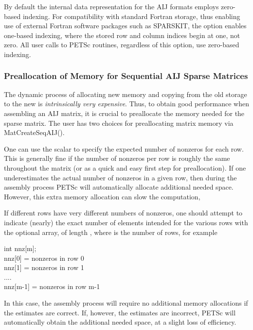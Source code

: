 By default the internal data representation for the AIJ formats employs
zero-based indexing.  For compatibility with standard Fortran storage,
thus enabling use of external Fortran software packages such as
SPARSKIT,  the option 
 enables one-based indexing, where the stored
row and column indices begin at one, not zero.  All user calls to
PETSc routines, regardless of this option, use zero-based indexing.

\subsubsection{Preallocation of Memory for Sequential AIJ Sparse Matrices}

The dynamic process of allocating new memory and copying from the old
storage to the new is {\em intrinsically very expensive}.  Thus, to
obtain good performance when assembling an AIJ matrix, it is crucial
to preallocate the memory needed for the sparse matrix.  The user has
two choices for preallocating matrix memory via MatCreateSeqAIJ(). 

One can use the scalar  to specify the expected
number of nonzeros for each row.  This is generally fine if the number
of nonzeros per row is roughly the same throughout the matrix (or as a
quick and easy first step for preallocation).  If one underestimates
the actual number of nonzeros in a given row, then during the assembly
process PETSc will automatically allocate additional needed space.
However, this extra memory allocation can slow the computation,

If different rows have very different numbers of nonzeros, one
should attempt to indicate (nearly) the exact number of elements
intended for the various rows with the optional array,  of
length , where  is the number of rows, for example
\begin{tabbing}
   int nnz[m];\\
   nnz[0] = \trl{<}nonzeros in row 0\trl{>}\\
   nnz[1] = \trl{<}nonzeros in row 1\trl{>}\\
   ....\\
   nnz[m-1] = \trl{<}nonzeros in row m-1\trl{>}
\end{tabbing}
In this case, the assembly process will require no additional memory
allocations if the  estimates are correct. If, however,
the  estimates are incorrect, PETSc will automatically
obtain the additional needed space, at a slight loss of efficiency.

